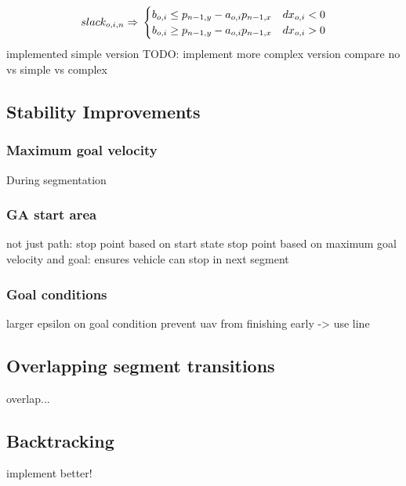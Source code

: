 \begin{equation}
\label{eq:corner-skip-fixed}
slack_{o,i,n} \Rightarrow \\
\begin{cases}
b_{o,i} \leq p_{n-1,y} - a_{o,i} p_{n-1,x} & dx_{o,i} < 0 \\
b_{o,i} \geq p_{n-1,y} - a_{o,i} p_{n-1,x} & dx_{o,i} > 0 \\
\end{cases}
\end{equation}
implemented simple version
TODO: implement more complex version
compare no vs simple vs complex


\subsection{Stability Improvements}

\subsubsection{Maximum goal velocity}
During segmentation

\subsubsection{GA start area}
not just path: stop point based on start state
stop point based on  maximum goal velocity and goal: ensures vehicle can stop in next segment

\subsubsection{Goal conditions}
larger epsilon on goal condition
prevent uav from finishing early -> use line

\subsection{Overlapping segment transitions}
overlap...

\subsection{Backtracking}
implement better!